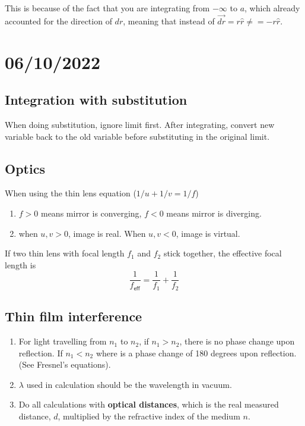 This is because of the fact that you are integrating from $-\infty$ to $a$, which already accounted for the direction of $dr$, meaning that instead of $\vec{dr}=r \hat{r}\neq =-r \hat{r}$. 


\section{06/10/2022}
\subsection{Integration with substitution}
When doing substitution, ignore limit first. After integrating, convert new variable back to the old variable before substituting in the original limit. 

\subsection{Optics}
When using the thin lens equation ($1/u+1/v=1/f$)

\begin{enumerate}
    \item $f>0$ means mirror is converging, $f<0$ means mirror is diverging. 
    \item when $u,v>0$, image is real. When $u,v<0$, image is virtual.
\end{enumerate}

If two thin lens with focal length $f_1$ and $f_2$ stick together, the effective focal length is 
\begin{equation}
    \frac{1}{f_\textsf{eff}}=\frac{1}{f_1}+\frac{1}{f_2}
\end{equation}

\subsection{Thin film interference}
\begin{enumerate}
    \item For light travelling from $n_1$ to $n_2$, if $n_1>n_2$, there is no phase change upon reflection. If $n_1<n_2$ where is a phase change of 180 degrees upon reflection. (See Fresnel's equations).
    \item  $\lambda$ used in calculation should be the wavelength in vacuum. 
    \item Do all calculations with \textbf{optical distances}, which is the real measured distance, $d$, multiplied by the refractive index of the medium $n$. 
\end{enumerate}


